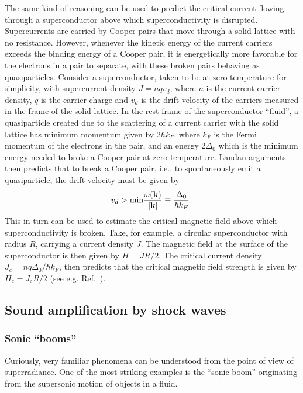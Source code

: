 \documentclass[11pt]{article}
\numberwithin{equation}{section} %
\begin{document}
The same kind of reasoning can be used to predict the critical current flowing through a superconductor above which superconductivity is disrupted. Supercurrents are carried by Cooper pairs that move through a solid lattice with no resistance. However, whenever the kinetic energy of the current carriers exceeds the binding energy of a Cooper pair, it is energetically more favorable for the electrons in a pair to separate, with these broken pairs behaving as quasiparticles. Consider a superconductor, taken to be at zero temperature for simplicity, with supercurrent density $J=n q v_d$, where $n$ is the current carrier density, $q$ is the carrier charge and  $v_d$ is the drift velocity of the carriers measured in the frame of the solid lattice. In the rest frame of the superconductor ``fluid'', a quasiparticle created due to the scattering of a current carrier with the solid lattice has minimum momentum given by $2\hbar k_F$, where $k_F$ is the Fermi momentum of the electrons in the pair, and an energy $2\Delta_0$ which is the minimum energy needed to broke a Cooper pair at zero temperature. Landau arguments then predicts that to break a Cooper pair, i.e., to spontaneously emit a quasiparticle, the drift velocity must be given by
\begin{equation}\label{landau_vel_conductor}
 v_d>{\rm min}\frac{\omega(\mathbf{k})}{|\mathbf{k}|}\equiv\frac{\Delta_0}{\hbar k_F}\,.
\end{equation}
This in turn can be used to estimate the critical magnetic field above which superconductivity is broken. Take, for example, a circular superconductor with radius $R$, carrying a current density $J$. The magnetic field at the surface of the superconductor is then given by $H=JR/2$. The critical current density $J_c=n q \Delta_0/\hbar k_F$, then predicts that the critical magnetic field strength is given by $H_c=J_cR/2$ (see e.g. Ref.~\cite{HughesSuper}).

\subsection{Sound amplification by shock waves}\label{sec:shock_waves}

\subsubsection{Sonic ``booms''}
Curiously, very familiar phenomena can be understood from the point of view of superradiance. One of the most striking examples is the ``sonic boom'' originating from the supersonic motion of objects in a fluid. 
\end{document}
